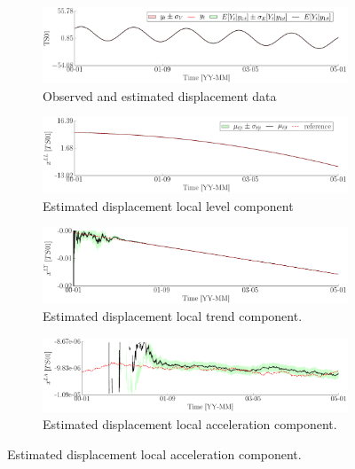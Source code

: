 \begin{figure}[h!]
\centering
\begin{subfigure}{\linewidth}
\includegraphics[width=0.9\linewidth]{./docfigs/Example_SYNTHETIC/default/TS01_ObservedPredicted.pdf}
\caption{Observed and estimated displacement data}
\end{subfigure}
\begin{subfigure}{\linewidth}
\includegraphics[width=0.9\linewidth]{./docfigs/Example_SYNTHETIC/default/TS01_LL_1.pdf} 
\caption{Estimated displacement local level component}
\end{subfigure}
\begin{subfigure}{\linewidth}
\includegraphics[width=0.9\linewidth]{./docfigs/Example_SYNTHETIC/default/TS01_LT_2.pdf}
\caption{Estimated displacement local trend component.}
\end{subfigure}
\begin{subfigure}{\linewidth}
\includegraphics[width=0.9\linewidth]{./docfigs/Example_SYNTHETIC/default/TS01_LA_3.pdf}
\caption{Estimated displacement local acceleration component.}
\end{subfigure}
\end{figure}
